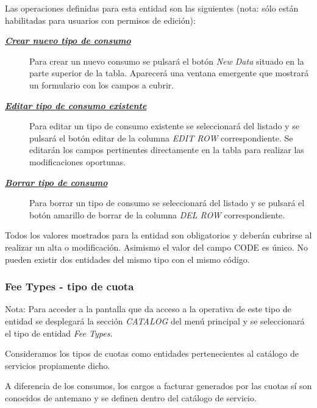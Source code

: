 Las operaciones definidas para esta entidad son las siguientes (nota: sólo están habilitadas para usuarios con permisos de edición):
\begin{description}
\item[\underline{\textsl{\textbf{Crear nuevo tipo de consumo}}}] Para crear un nuevo consumo se pulsará el botón \textit{New Data} situado en la parte superior de la tabla. Aparecerá una ventana emergente que mostrará un formulario con los campos a cubrir.

\item[\underline{\textsl{\textbf{Editar tipo de consumo existente}}}] Para editar un tipo de consumo existente se seleccionará del listado y se pulsará el botón editar de la columna \textit{EDIT ROW} correspondiente. Se editarán los campos pertinentes directamente en la tabla para realizar las modificaciones oportunas.

\item[\underline{\textsl{\textbf{Borrar tipo de consumo}}}] Para borrar un tipo de consumo se seleccionará del listado y se pulsará el botón amarillo de borrar de la columna \textit{DEL ROW} correspondiente.
\end{description}

Todos los valores mostrados para la entidad son obligatorios y deberán cubrirse al realizar un alta o modificación. Asimismo el valor del campo CODE es único. No pueden existir dos entidades del mismo tipo con el mismo código.





\subsubsection{Fee Types - tipo de cuota}
\label{sub:fee-type}

Nota: Para acceder a la pantalla que da acceso a la operativa de este tipo de entidad se desplegará la sección \emph{CATALOG} del menú principal y se seleccionará el tipo de entidad \emph{Fee Types}.

Consideramos los tipos de cuotas como entidades pertenecientes al catálogo de servicios propiamente dicho.

A diferencia de los consumos, los cargos a facturar generados por las cuotas sí son conocidos de antemano y se definen dentro del catálogo de servicio.

